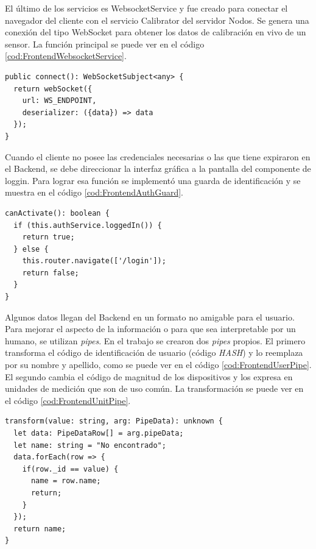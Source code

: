 El último de los servicios es WebsocketService y fue creado para conectar el navegador del cliente con el servicio Calibrator del servidor Nodos.
Se genera una conexión del tipo WebSocket para obtener los datos de calibración en vivo de un sensor.
La función principal se puede ver en el código \ref{cod:FrontendWebsocketService}.

\begin{lstlisting}[label=cod:FrontendWebsocketService,caption=Función principal de WebsocketService]
public connect(): WebSocketSubject<any> {
  return webSocket({
    url: WS_ENDPOINT,
    deserializer: ({data}) => data
  });
}
\end{lstlisting}

Cuando el cliente no posee las credenciales necesarias o las que tiene expiraron en el Backend, se debe direccionar la interfaz gráfica a la pantalla del componente de loggin.
Para lograr esa función se implementó una guarda de identificación y se muestra en el código \ref{cod:FrontendAuthGuard}.

\begin{lstlisting}[label=cod:FrontendAuthGuard,caption=Función de guarda de identificación]
canActivate(): boolean {
  if (this.authService.loggedIn()) {
    return true;
  } else {
    this.router.navigate(['/login']);
    return false;
  }
}
\end{lstlisting}

Algunos datos llegan del Backend en un formato no amigable para el usuario. Para mejorar el aspecto de la información o para que sea interpretable por un humano, se utilizan \emph{pipes}.
En el trabajo se crearon dos \emph{pipes} propios. 
El primero transforma el código de identificación de usuario (código \emph{HASH}) y lo reemplaza por su nombre y apellido, como se puede ver en el código \ref{cod:FrontendUserPipe}.
El segundo cambia el código de magnitud de los dispositivos y los expresa en unidades de medición que son de uso común. La transformación se puede ver en el código \ref{cod:FrontendUnitPipe}.

\begin{lstlisting}[label=cod:FrontendUserPipe,caption=Función de pipe de usuario]
transform(value: string, arg: PipeData): unknown {
  let data: PipeDataRow[] = arg.pipeData;
  let name: string = "No encontrado";
  data.forEach(row => {
    if(row._id == value) {
      name = row.name;
      return;
    }
  });
  return name;
}
\end{lstlisting}

